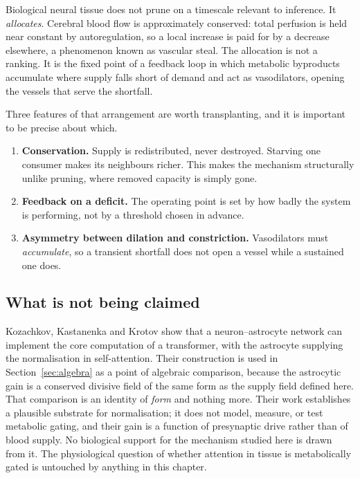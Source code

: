 \documentclass[11pt]{report}
\theoremstyle{plain}
\theoremstyle{definition}
\theoremstyle{remark}
\begin{document}
Biological neural tissue does not prune on a timescale relevant to inference. It
\emph{allocates}. Cerebral blood flow is approximately conserved: total perfusion is held
near constant by autoregulation, so a local increase is paid for by a decrease elsewhere,
a phenomenon known as vascular steal. The allocation is not a ranking. It is the fixed
point of a feedback loop in which metabolic byproducts accumulate where supply falls short
of demand and act as vasodilators, opening the vessels that serve the shortfall.

Three features of that arrangement are worth transplanting, and it is important to be
precise about which.

\begin{enumerate}
\item \textbf{Conservation.} Supply is redistributed, never destroyed. Starving one
      consumer makes its neighbours richer. This makes the mechanism structurally unlike
      pruning, where removed capacity is simply gone.
\item \textbf{Feedback on a deficit.} The operating point is set by how badly the system
      is performing, not by a threshold chosen in advance.
\item \textbf{Asymmetry between dilation and constriction.} Vasodilators must
      \emph{accumulate}, so a transient shortfall does not open a vessel while a
      sustained one does.
\end{enumerate}

\subsection{What is not being claimed}
\label{sec:notclaimed}

Kozachkov, Kastanenka and Krotov \cite{kozachkov2023} show that a neuron--astrocyte
network can implement the core computation of a transformer, with the astrocyte supplying
the normalisation in self-attention. Their construction is used in
Section~\ref{sec:algebra} as a point of algebraic comparison, because the astrocytic gain
is a conserved divisive field of the same form as the supply field defined here. That
comparison is an identity of \emph{form} and nothing more. Their work establishes a
plausible substrate for normalisation; it does not model, measure, or test metabolic
gating, and their gain is a function of presynaptic drive rather than of blood supply.
No biological support for the mechanism studied here is drawn from it. The physiological
question of whether attention in tissue is metabolically gated is untouched by anything
in this chapter.
\end{document}
